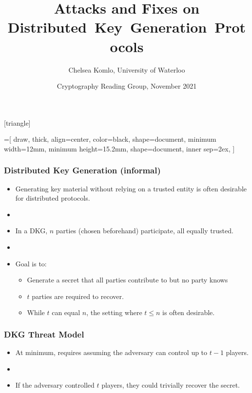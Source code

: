 \documentclass[hyperref={pdfpagelabels=true},table,dvipsnames,14pt,aspectratio=169]{beamer}
\title{Attacks and Fixes on Distributed~Key~Generation~Protocols}
\author{Chelsea Komlo, University of Waterloo}
\date[November 2021]{ Cryptography Reading Group, November 2021}
\begin{document}
[triangle]

=[%
draw,
thick,
align=center,
color=black,
shape=document,
minimum width=12mm,
minimum height=15.2mm,
shape=document,
inner sep=2ex,
]

\begin{frame}
        \thispagestyle{empty}
        \maketitle
\end{frame}


\begin{frame}
  \frametitle{Distributed Key Generation (informal)}

  \begin{itemize}
    \item<1-> Generating key material without relying on a trusted entity is often desirable for distributed protocols.
    \item[]
    \item<2-> In a DKG, $n$ parties (chosen beforehand) participate, all equally trusted.
    \item[]
    \item<3-> Goal is to:
  \begin{itemize}
    \item<4-> Generate a secret that all parties contribute to but no party knows
    \item<5-> $t$ parties are required to recover.
    \item<6-> While $t$ can equal $n$, the setting where $t \leq n$ is often desirable.
  \end{itemize}
  \end{itemize}
\end{frame}

\begin{frame}
  \frametitle{DKG Threat Model}

  \begin{itemize}
    \item<1-> At minimum, requires assuming the adversary can control up to $t-1$ players.
    \item[]
    \item<2-> If the adversary controlled $t$ players, they could trivially recover the secret.
  \end{itemize}
\end{frame}
\end{document}
